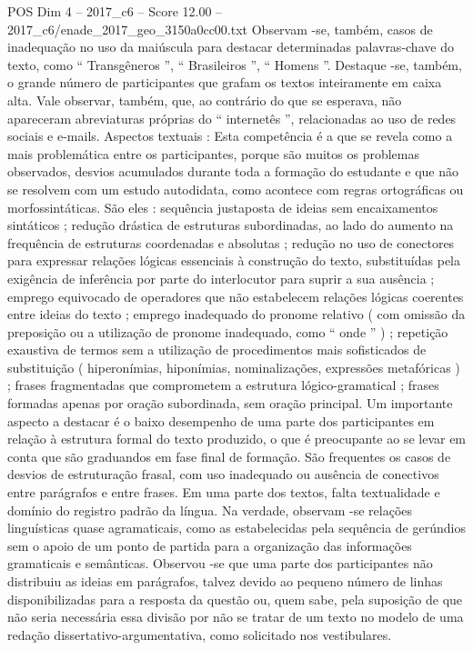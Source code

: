 \begin{textsample}{POS Dim 4 – 2017\_c6 – Score 12.00 – 2017\_c6/enade\_2017\_geo\_3150a0cc00.txt}
Observam -se, também, casos de inadequação no uso da maiúscula para destacar determinadas palavras-chave do texto, como “ Transgêneros ”, “ Brasileiros ”, “ Homens ”.
Destaque -se, também, o grande número de participantes que grafam os textos inteiramente em caixa alta.
Vale observar, também, que, ao contrário do que se esperava, não apareceram abreviaturas próprias do “ internetês ”, relacionadas ao uso de redes sociais e e-mails.
Aspectos textuais : Esta competência é a que se revela como a mais problemática entre os participantes, porque são muitos os problemas observados, desvios acumulados durante toda a formação do estudante e que não se resolvem com um estudo autodidata, como acontece com regras ortográficas ou morfossintáticas.
São eles : sequência justaposta de ideias sem encaixamentos sintáticos ; redução drástica de estruturas subordinadas, ao lado do aumento na frequência de estruturas coordenadas e absolutas ; redução no uso de conectores para expressar relações lógicas essenciais à construção do texto, substituídas pela exigência de inferência por parte do interlocutor para suprir a sua ausência ; emprego equivocado de operadores que não estabelecem relações lógicas coerentes entre ideias do texto ; emprego inadequado do pronome relativo ( com omissão da preposição ou a utilização de pronome inadequado, como “ onde ” ) ; repetição exaustiva de termos sem a utilização de procedimentos mais sofisticados de substituição ( hiperonímias, hiponímias, nominalizações, expressões metafóricas ) ; frases fragmentadas que comprometem a estrutura lógico-gramatical ; frases formadas apenas por oração subordinada, sem oração principal.
Um importante aspecto a destacar é o baixo desempenho de uma parte dos participantes em relação à estrutura formal do texto produzido, o que é preocupante ao se levar em conta que são graduandos em fase final de formação.
São frequentes os casos de desvios de estruturação frasal, com uso inadequado ou ausência de conectivos entre parágrafos e entre frases.
Em uma parte dos textos, falta textualidade e domínio do registro padrão da língua.
Na verdade, observam -se relações linguísticas quase agramaticais, como as estabelecidas pela sequência de gerúndios sem o apoio de um ponto de partida para a organização das informações gramaticais e semânticas.
Observou -se que uma parte dos participantes não distribuiu as ideias em parágrafos, talvez devido ao pequeno número de linhas disponibilizadas para a resposta da questão ou, quem sabe, pela suposição de que não seria necessária essa divisão por não se tratar de um texto no modelo de uma redação dissertativo-argumentativa, como solicitado nos vestibulares.

\end{textsample}
